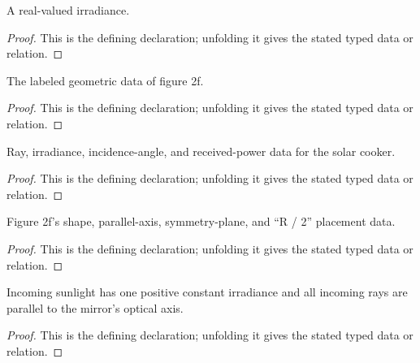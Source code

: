\begin{definition}[IrradianceQuantity]
  \label{decl:physics:IPhO_2026_2_B_2:IrradianceQuantity}
  A real-valued irradiance.
\end{definition}
\begin{proof}
  This is the defining declaration; unfolding it gives the stated typed data or relation.
\end{proof}

\begin{definition}
  \label{decl:physics:IPhO_2026_2_B_2:Figure2fGeometry}
  The labeled geometric data of figure 2f.
\end{definition}
\begin{proof}
  This is the defining declaration; unfolding it gives the stated typed data or relation.
\end{proof}

\begin{definition}[OpticalModel]
  \label{decl:physics:IPhO_2026_2_B_2:OpticalModel}
  Ray, irradiance, incidence-angle, and received-power data for the solar cooker.
\end{definition}
\begin{proof}
  This is the defining declaration; unfolding it gives the stated typed data or relation.
\end{proof}

\begin{definition}
  \label{decl:physics:IPhO_2026_2_B_2:HasFigure2fPlacement}
  Figure 2f's shape, parallel-axis, symmetry-plane, and “R / 2” placement data.
\end{definition}
\begin{proof}
  This is the defining declaration; unfolding it gives the stated typed data or relation.
\end{proof}

\begin{definition}[HasUniformParallelSunlight]
  \label{decl:physics:IPhO_2026_2_B_2:HasUniformParallelSunlight}
  Incoming sunlight has one positive constant irradiance and all incoming rays are parallel to the mirror's optical axis.
\end{definition}
\begin{proof}
  This is the defining declaration; unfolding it gives the stated typed data or relation.
\end{proof}

